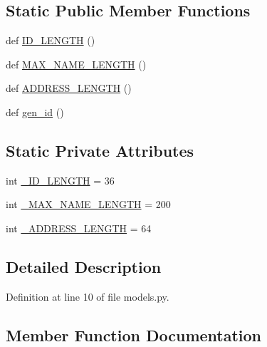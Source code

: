 \subsection*{Static Public Member Functions}
\begin{DoxyCompactItemize}
\item 
def \hyperlink{classmemoryoracle_1_1models_1_1Schema_a260988152dd1cc52d223ed0d3efb9f00}{I\+D\+\_\+\+L\+E\+N\+G\+T\+H} ()
\item 
def \hyperlink{classmemoryoracle_1_1models_1_1Schema_a68855359e1f1cbe9d4b405b9e7f971f1}{M\+A\+X\+\_\+\+N\+A\+M\+E\+\_\+\+L\+E\+N\+G\+T\+H} ()
\item 
def \hyperlink{classmemoryoracle_1_1models_1_1Schema_a74a66840ff49dc210b84e24a90194ccd}{A\+D\+D\+R\+E\+S\+S\+\_\+\+L\+E\+N\+G\+T\+H} ()
\item 
def \hyperlink{classmemoryoracle_1_1models_1_1Schema_a633676020df5491e943a7447fd21e31c}{gen\+\_\+id} ()
\end{DoxyCompactItemize}
\subsection*{Static Private Attributes}
\begin{DoxyCompactItemize}
\item 
int \hyperlink{classmemoryoracle_1_1models_1_1Schema_adace6a65c18d9a490d90ef287df42149}{\+\_\+\+I\+D\+\_\+\+L\+E\+N\+G\+T\+H} = 36
\item 
int \hyperlink{classmemoryoracle_1_1models_1_1Schema_a07bc973f22599224844d9316c86f50d5}{\+\_\+\+M\+A\+X\+\_\+\+N\+A\+M\+E\+\_\+\+L\+E\+N\+G\+T\+H} = 200
\item 
int \hyperlink{classmemoryoracle_1_1models_1_1Schema_abe3a484d6ee69f03ad672834a0cf7bb6}{\+\_\+\+A\+D\+D\+R\+E\+S\+S\+\_\+\+L\+E\+N\+G\+T\+H} = 64
\end{DoxyCompactItemize}


\subsection{Detailed Description}


Definition at line 10 of file models.\+py.



\subsection{Member Function Documentation}
\hypertarget{classmemoryoracle_1_1models_1_1Schema_a74a66840ff49dc210b84e24a90194ccd}{}
